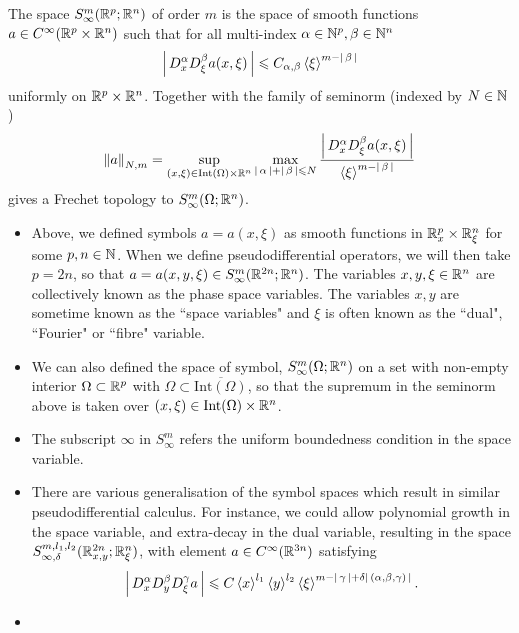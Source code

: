\documentclass[12pt]{article}
\begin{document}
\begin{fdefinition}
    The space $S^m_\infty(\R^p; \R^n)$ of order $m$ is the space of smooth functions $a \in C^\infty(\R^p \times \R^n)$ such that for all multi-index $\alpha \in \N^p, \beta \in \N^n$
    \begin{align*}
        \abs{D^\alpha_x D^\beta_\xi a (x, \xi)} \leq C_{\alpha, \beta} \sym[\xi]^{m - \abs{\beta}} 
    \end{align*}
    uniformly on $\R^p \times \R^n$. Together with the family of seminorm (indexed by $N \in \N$) 
    \begin{align*}
        \norm[a]_{N, m} = \sup_{(x, \xi) \in \mathrm{Int}(\Omega) \times \R^n} \max_{\abs{\alpha} + \abs{\beta} \leq N} \frac{\abs{D^\alpha_x D^\beta_\xi a(x, \xi)}}{\sym[\xi]^{m - \abs{\beta}}} 
    \end{align*}
    gives a Frechet topology to $S^m_\infty(\Omega; \R^n)$. \\
\end{fdefinition}
\begin{rem} \hfill 
    \begin{itemize}
        \item Above, we defined symbols $a = a(x, \xi)$ as smooth functions in $\R^p_x \times \R^n_\xi$ for some $p, n \in \N$. When we define pseudodifferential operators, we will then take $p = 2n$, so that $a = a(x, y, \xi) \in S^{m}_\infty(\R^{2n}; \R^n)$. The variables $x, y, \xi \in \R^n$  are collectively known as the phase space variables. The variables $x, y$ are sometime known as the ``space variables" and $\xi$ is often known as the ``dual", ``Fourier" or ``fibre" variable.
        
        \item  We can also defined the space of symbol, $S^m_\infty(\Omega; \R^n)$ on a set with non-empty interior $\Omega \subset \R^p$ with $\Omega \subset \overline{\mathrm{Int}(\Omega)}$, so that the supremum in the seminorm above is taken over $(x, \xi) \in \mathrm{Int}(\Omega) \times \R^n$. 
        
        \item The subscript $\infty$ in $S^m_\infty$ refers the uniform boundedness condition in the space variable.
        
        \item There are various generalisation of the symbol spaces which result in similar pseudodifferential calculus. For instance, we could allow polynomial growth in the space variable, and extra-decay in the dual variable, resulting in the space $S^{m, l_1, l_2}_{\infty, \delta}(\R^{2n}_{x, y}; \R^n_{\xi})$, with element $a \in C^\infty(\R^{3n})$ satisfying
        \begin{align*}
        \abs{D^\alpha_xD^\beta_y D^\gamma_\xi a} \leq C \sym[x]^{l_1} \sym[y]^{l_2} \sym[\xi]^{m - \abs{\gamma} + \delta \abs{(\alpha, \beta, \gamma)}}. 
        \end{align*}
        
        \item {}
    \end{itemize}
\end{rem}
\end{document}
